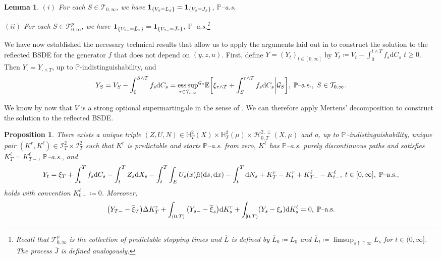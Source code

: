 \documentclass[10pt]{article} %
\newtheorem{lemma}[theorem]{Lemma}
\newtheorem{proposition}[theorem]{Proposition}
\newcommand\cG{\mathcal G}
\newcommand\cT{\mathcal T}
\newcommand{\smalltext}[1]{\text{\fontsize{4}{4}\selectfont$#1$}}
\def \E{\mathbb{E}}
\def \P{\mathbb{P}}
\newcommand{\1}{\mathbf{1}}
\def\d{\mathrm{d}}
\DeclareMathOperator*{\esssup}{ess\,sup}
\begin{document}
\begin{lemma}\label{lem::snell_indicator}
	$(i)$ For each $S \in \cT_{0,\infty}$, we have $\mathbf{1}_{\{V_\smalltext{S} = L_\smalltext{S}\}} = \mathbf{1}_{\{V_\smalltext{S} = J_\smalltext{S}\}}$, $\P${\rm--a.s.}
	
	\medskip
	$(ii)$ For each $S \in \cT^p_{0,\infty}$, we have $\mathbf{1}_{\{V_{\smalltext{S}\smalltext{-}} = \bar L_\smalltext{S}\}} = \mathbf{1}_{\{V_{\smalltext{S}\smalltext{-}} = \bar J_\smalltext{S}\}}$, $\P${\rm--a.s.}\footnote{Recall that $\cT^p_{0,\infty}$ is the collection of predictable stopping times and $\overline L$ is defined by $\overline L_0 \coloneqq L_0$ and $\overline L_t \coloneqq \limsup_{s \uparrow\uparrow \infty} L_s$ for $t \in (0,\infty]$. The process $\overline J$ is defined analogously.}
\end{lemma}


	
We have now established the necessary technical results that allow us to apply the arguments laid out in \cite{grigorova2020optimal} to construct the solution to the reflected BSDE for the generator $f$ that does not depend on $(y,z,u)$. First, define $Y = (Y_t)_{t \in [0,\infty]}$ by $Y_t \coloneqq V_t - \int_0^{t \land T} f_s \d C_s$ $t\geq 0$. Then $Y_\cdot = Y_{\cdot \land T}$, up to $\P$-indistinguishability, and
\begin{equation*}
	Y_S = V_S - \int_0^{S \land T} f_s \d C_s = {\esssup_{\tau \in \cT_{\smalltext{S}\smalltext{,}\smalltext{\infty}}}}^{\cG_\smalltext{S}} \E\bigg[\xi_{\tau \land T} + \int_S^{\tau \land T} f_s \d C_s \bigg| \cG_S\bigg], \; \text{$\P$--a.s.}, \; S \in \cT_{0,\infty}.
\end{equation*}

We know by now that $V$ is a strong optional supermartingale in the sense of \cite[Appendix I]{dellacherie1982probabilities}. We can therefore apply Mertens' decomposition to construct the solution to the reflected BSDE.

\begin{proposition}\label{lem::snell_decomposition}
	There exists a unique triple
$(Z,U,N) \in \mathbb{H}^{2}_{T}(X) \times \mathbb{H}^{2}_{T}(
\mu ) \times \mathcal H^{2,\perp}_{0,T}(X,\mu )$ and a, up to $\mathbb{P}$--indistinguish\-ability, unique pair $(K^{r},K^{\ell}) \in \mathcal I^{2}_{T}
\times \mathcal I^{2}_{T}$ such that $K^{r}$ is predictable and starts
$\mathbb{P}$--\textup{a.s.} from zero, $K^\ell$ has $\P$--{\rm a.s.} purely discontinuous paths and satisfies $K^\ell_T = K^\ell_{T-}$, \textnormal{$\P$--a.s.}, and
		\begin{equation*}
			Y_t = \xi_T + \int_t^T f_s \d C_s - \int_t^T Z_s\d X_s - \int_t^T\int_E U_s(x)\tilde\mu(\d s, \d x) - \int_t^T \d N_s + K^r_T - K^r_t + K^\ell_{T-} - K^\ell_{t-}, \; t \in [0,\infty], \; \text{$\P${\rm--a.s.}},
		\end{equation*}
		holds with convention $K^\ell_{0-}\coloneqq 0$. Moreover,
	\[
		 \big(Y_{T-} - \overline{\xi}_T\big) \Delta K^r_T + \int_{(0,T)} \big(Y_{s-} - \overline{\xi}_s\big) \d K^r_s + \int_{[0,T)} (Y_s - \xi_s) \d K^\ell_s = 0, \;\text{$\P$\rm--a.s.}
	\]
\end{proposition}
\end{document}
